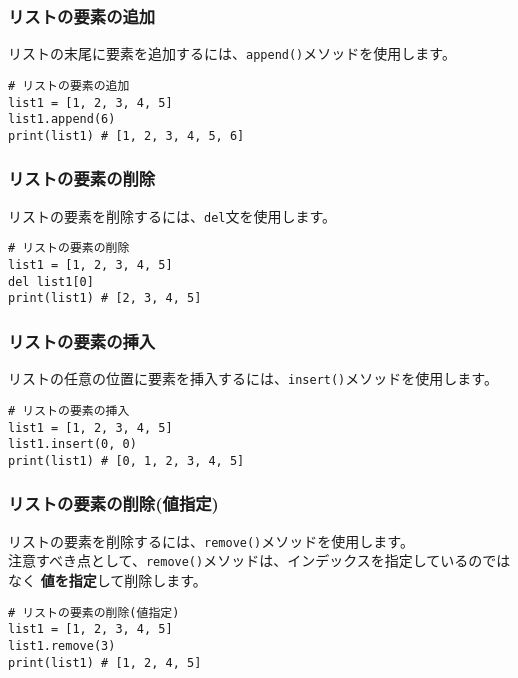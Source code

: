 \documentclass[a4paper,titlepage,dvipdfmx]{jarticle}
\begin{document}
\subsubsection{リストの要素の追加}
リストの末尾に要素を追加するには、\texttt{append()}メソッドを使用します。\\
\begin{lstlisting}[caption=リストの要素の追加,label=リストの要素の追加]
# リストの要素の追加
list1 = [1, 2, 3, 4, 5]
list1.append(6)
print(list1) # [1, 2, 3, 4, 5, 6]
\end{lstlisting}

\subsubsection{リストの要素の削除}
リストの要素を削除するには、\texttt{del}文を使用します。\\
\begin{lstlisting}[caption=リストの要素の削除,label=リストの要素の削除]
# リストの要素の削除
list1 = [1, 2, 3, 4, 5]
del list1[0]
print(list1) # [2, 3, 4, 5]
\end{lstlisting}

\subsubsection{リストの要素の挿入}
リストの任意の位置に要素を挿入するには、\texttt{insert()}メソッドを使用します。\\
\begin{lstlisting}[caption=リストの要素の挿入,label=リストの要素の挿入]
# リストの要素の挿入
list1 = [1, 2, 3, 4, 5]
list1.insert(0, 0)
print(list1) # [0, 1, 2, 3, 4, 5]
\end{lstlisting}

\subsubsection{リストの要素の削除(値指定)}
リストの要素を削除するには、\texttt{remove()}メソッドを使用します。\\
注意すべき点として、\texttt{remove()}メソッドは、インデックスを指定しているのではなく
\textbf{値を指定}して削除します。\\
\begin{lstlisting}[caption=リストの要素の削除(値指定),label=リストの要素の削除(値指定)]
# リストの要素の削除(値指定)
list1 = [1, 2, 3, 4, 5]
list1.remove(3)
print(list1) # [1, 2, 4, 5]
\end{lstlisting}
\end{document}
